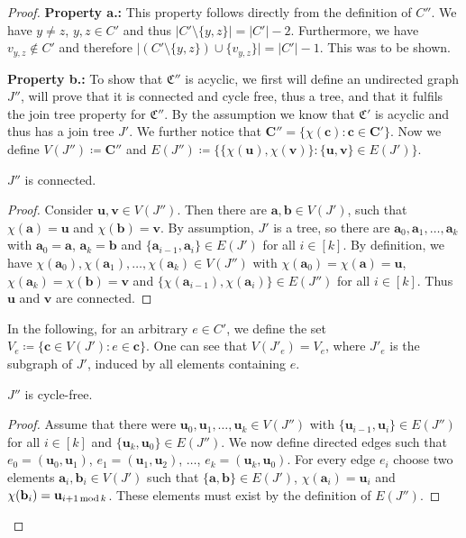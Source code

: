 \begin{proof}
	\textbf{Property a.:}
	This property follows directly from the definition of $C''$.
	We have $y\neq z$, $y,z\in C'$ and thus $\vert C'\setminus \{y,z\}\vert = \vert C'\vert -2$.
	Furthermore, we have $v_{y,z}\notin C'$ and therefore $\vert (C'\setminus \{y,z\})\cup \{v_{y,z}\}\vert = \vert C' \vert -1$.
	This was to be shown.
	
	\textbf{Property b.:}
	To show that $\mathfrak C''$ is acyclic, we first will define an undirected graph $J''$, will prove that it is connected and cycle free, thus a tree, and that it fulfils the join tree property for $\mathfrak C''$.
	By the assumption we know that $\mathfrak C'$ is acyclic and thus has a join tree $J'$.
	We further notice that $\mathbf{C''}=\{\chi(\mathbf c) : \mathbf c\in \mathbf{C'}\}$.
	Now we define $V(J'')\coloneqq \mathbf{C''}$ and $E(J'')\coloneqq \{\{\chi(\mathbf u),\chi(\mathbf v)\} : \{\mathbf u,\mathbf v\}\in E(J')\}$.
	
	\begin{claim}
		$J''$ is connected.
	\end{claim}
	\begin{proof}
		Consider $\mathbf u,\mathbf v\in V(J'')$.
		Then there are $\mathbf a,\mathbf b\in V(J')$, such that $\chi(\mathbf a)=\mathbf u$ and $\chi(\mathbf b)=\mathbf v$.
		By assumption, $J'$ is a tree, so there are $\mathbf a_0,\mathbf a_1,\dots,\mathbf a_k$ with $\mathbf a_0=\mathbf a$, $\mathbf a_k=\mathbf b$ and $\{\mathbf a_{i-1},\mathbf a_{i}\}\in E(J')$ for all $i\in [k]$.
		By definition, we have $\chi(\mathbf a_0),\chi(\mathbf a_1),\dots,\chi(\mathbf a_k)\in V(J'')$ with $\chi(\mathbf a_0)=\chi(\mathbf a)=\mathbf u$, $\chi(\mathbf a_k)=\chi(\mathbf b)=\mathbf v$ and $\{\chi(\mathbf a_{i-1}),\chi(\mathbf a_i)\}\in E(J'')$ for all $i\in[k]$.
		Thus $\mathbf u$ and $\mathbf v$ are connected.
	\end{proof}
	
	In the following, for an arbitrary $e \in C'$, we define the set $V_e\coloneqq \{\mathbf c\in V(J') : e\in \mathbf c\}$.
	One can see that $V(J'_e)=V_e$, where $J'_e$ is the subgraph of $J'$, induced by all elements containing $e$.
	
	\begin{claim}
		$J''$ is cycle-free.
	\end{claim}
	\begin{proof}
		Assume that there were $\mathbf u_0,\mathbf u_1,\dots,\mathbf u_k\in V(J'')$ with $\{\mathbf u_{i-1},\mathbf u_i\}\in E(J'')$ for all $i\in [k]$ and $\{\mathbf u_k,\mathbf u_0\}\in E(J'')$.
		We now define directed edges such that $e_0=(\mathbf u_0,\mathbf u_1)$, $e_1=(\mathbf u_1,\mathbf u_2)$, $\dots$, $e_k=(\mathbf u_k,\mathbf u_0)$.
		For every edge $e_i$ choose two elements $\mathbf a_i,\mathbf b_i\in V(J')$ such that $\{\mathbf a,\mathbf b\}\in E(J')$, $\chi(\mathbf a_i)=\mathbf u_i$ and $\chi(\mathbf b_i)=\mathbf u_{i+1\operatorname{mod} k}$.
		These elements must exist by the definition of $E(J'')$.
		

\end{proof}
\end{proof}
